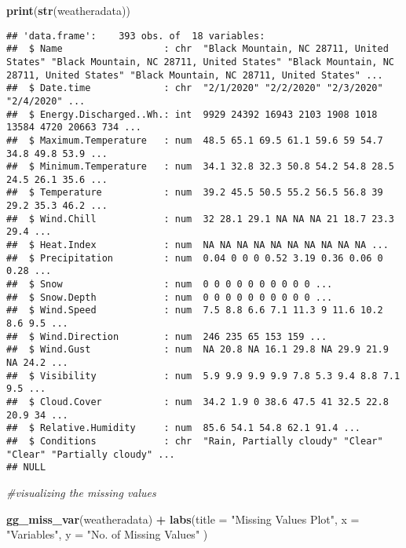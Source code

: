 \documentclass[
]{article}
\newenvironment{Shaded}{\begin{snugshade}}{\end{snugshade}}
\newcommand{\AttributeTok}[1]{\textcolor[rgb]{0.13,0.29,0.53}{#1}}
\newcommand{\CommentTok}[1]{\textcolor[rgb]{0.56,0.35,0.01}{\textit{#1}}}
\newcommand{\FunctionTok}[1]{\textcolor[rgb]{0.13,0.29,0.53}{\textbf{#1}}}
\newcommand{\NormalTok}[1]{#1}
\newcommand{\SpecialCharTok}[1]{\textcolor[rgb]{0.81,0.36,0.00}{\textbf{#1}}}
\newcommand{\StringTok}[1]{\textcolor[rgb]{0.31,0.60,0.02}{#1}}
\begin{document}
\begin{Shaded}
\begin{Highlighting}[]
\FunctionTok{print}\NormalTok{(}\FunctionTok{str}\NormalTok{(weatheradata))}
\end{Highlighting}
\end{Shaded}

\begin{verbatim}
## 'data.frame':    393 obs. of  18 variables:
##  $ Name                  : chr  "Black Mountain, NC 28711, United States" "Black Mountain, NC 28711, United States" "Black Mountain, NC 28711, United States" "Black Mountain, NC 28711, United States" ...
##  $ Date.time             : chr  "2/1/2020" "2/2/2020" "2/3/2020" "2/4/2020" ...
##  $ Energy.Discharged..Wh.: int  9929 24392 16943 2103 1908 1018 13584 4720 20663 734 ...
##  $ Maximum.Temperature   : num  48.5 65.1 69.5 61.1 59.6 59 54.7 34.8 49.8 53.9 ...
##  $ Minimum.Temperature   : num  34.1 32.8 32.3 50.8 54.2 54.8 28.5 24.5 26.1 35.6 ...
##  $ Temperature           : num  39.2 45.5 50.5 55.2 56.5 56.8 39 29.2 35.3 46.2 ...
##  $ Wind.Chill            : num  32 28.1 29.1 NA NA NA 21 18.7 23.3 29.4 ...
##  $ Heat.Index            : num  NA NA NA NA NA NA NA NA NA NA ...
##  $ Precipitation         : num  0.04 0 0 0 0.52 3.19 0.36 0.06 0 0.28 ...
##  $ Snow                  : num  0 0 0 0 0 0 0 0 0 0 ...
##  $ Snow.Depth            : num  0 0 0 0 0 0 0 0 0 0 ...
##  $ Wind.Speed            : num  7.5 8.8 6.6 7.1 11.3 9 11.6 10.2 8.6 9.5 ...
##  $ Wind.Direction        : num  246 235 65 153 159 ...
##  $ Wind.Gust             : num  NA 20.8 NA 16.1 29.8 NA 29.9 21.9 NA 24.2 ...
##  $ Visibility            : num  5.9 9.9 9.9 9.9 7.8 5.3 9.4 8.8 7.1 9.5 ...
##  $ Cloud.Cover           : num  34.2 1.9 0 38.6 47.5 41 32.5 22.8 20.9 34 ...
##  $ Relative.Humidity     : num  85.6 54.1 54.8 62.1 91.4 ...
##  $ Conditions            : chr  "Rain, Partially cloudy" "Clear" "Clear" "Partially cloudy" ...
## NULL
\end{verbatim}

\begin{Shaded}
\begin{Highlighting}[]
\CommentTok{\#visualizing the missing values }

\FunctionTok{gg\_miss\_var}\NormalTok{(weatheradata) }\SpecialCharTok{+}
  \FunctionTok{labs}\NormalTok{(}\AttributeTok{title =} \StringTok{"Missing Values Plot"}\NormalTok{,}
       \AttributeTok{x =} \StringTok{"Variables"}\NormalTok{, }
       \AttributeTok{y =} \StringTok{"No. of Missing Values"}\NormalTok{ )}
\end{Highlighting}
\end{Shaded}
\end{document}
